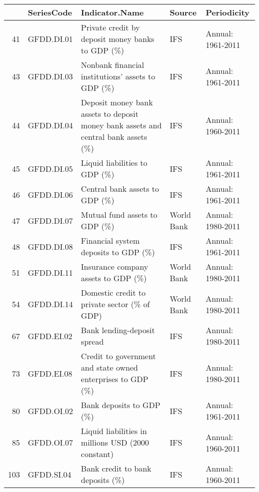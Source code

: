 \begin{tabular}{rllll}
  \hline
 & SeriesCode & Indicator.Name & Source & Periodicity \\
  \hline
41 & GFDD.DI.01 & Private credit by deposit money banks to GDP (\%) & IFS & Annual: 1961-2011 \\
  43 & GFDD.DI.03 & Nonbank financial institutions' assets to GDP (\%) & IFS & Annual: 1961-2011 \\
  44 & GFDD.DI.04 & Deposit money bank assets to deposit money bank assets and central bank assets (\%) & IFS & Annual: 1960-2011 \\
  45 & GFDD.DI.05 & Liquid liabilities to GDP (\%) & IFS & Annual: 1961-2011 \\
  46 & GFDD.DI.06 & Central bank assets to GDP (\%) & IFS & Annual: 1961-2011 \\
  47 & GFDD.DI.07 & Mutual fund assets to GDP (\%) & World Bank & Annual: 1980-2011 \\
  48 & GFDD.DI.08 & Financial system deposits to GDP (\%) & IFS & Annual: 1961-2011 \\
  51 & GFDD.DI.11 & Insurance company assets to GDP (\%) & World Bank & Annual: 1980-2011 \\
  54 & GFDD.DI.14 & Domestic credit to private sector (\% of GDP) & World Bank & Annual: 1980-2011 \\ 
  67 & GFDD.EI.02 & Bank lending-deposit spread & IFS & Annual: 1980-2011 \\
  73 & GFDD.EI.08 & Credit to government and state owned enterprises to GDP (\%) & IFS & Annual: 1980-2011 \\
  80 & GFDD.OI.02 & Bank deposits to GDP (\%) & IFS & Annual: 1961-2011 \\
  85 & GFDD.OI.07 & Liquid liabilities in millions USD (2000 constant) & IFS & Annual: 1960-2011 \\
  103 & GFDD.SI.04 & Bank credit to bank deposits (\%) & IFS & Annual: 1960-2011 \\
   \hline
\end{tabular}
